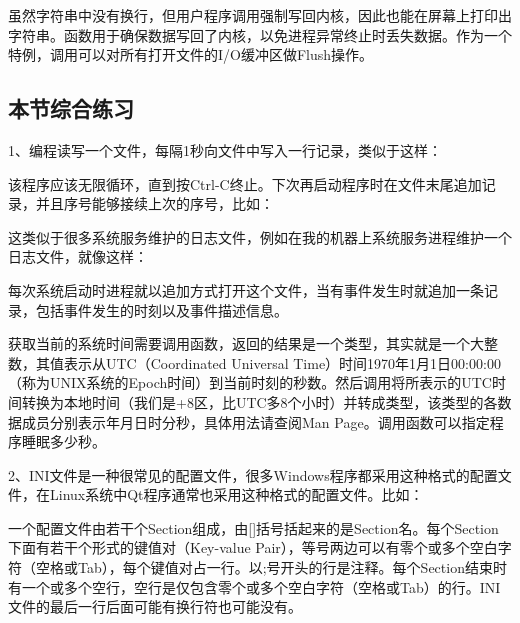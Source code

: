 虽然字符串中没有换行，但用户程序调用强制写回内核，因此也能在屏幕上打印出字符串。函数用于确保数据写回了内核，以免进程异常终止时丢失数据。作为一个特例，调用可以对所有打开文件的I/\BookSplit{}O缓冲区做Flush操作。


\subsection{本节综合练习}
%


1、编程读写一个文件，每隔1秒向文件中写入一行记录，类似于这样：




该程序应该无限循环，直到按Ctrl-C终止。下次再启动程序时在文件末尾追加记录，并且序号能够接续上次的序号，比如：




这类似于很多系统服务维护的日志文件，例如在我的机器上系统服务进程维护一个日志文件，就像这样：




每次系统启动时进程就以追加方式打开这个文件，当有事件发生时就追加一条记录，包括事件发生的时刻以及事件描述信息。



获取当前的系统时间需要调用函数，返回的结果是一个类型，其实就是一个大整数，其值表示从UTC（Coordinated Universal Time）时间1970年1月1日00:\BookSplit{}00:\BookSplit{}00（称为UNIX系统的Epoch时间）到当前时刻的秒数。然后调用将所表示的UTC时间转换为本地时间（我们是+8区，比UTC多8个小时）并转成类型，该类型的各数据成员分别表示年月日时分秒，具体用法请查阅Man Page。调用函数可以指定程序睡眠多少秒。



2、INI文件是一种很常见的配置文件，很多Windows程序都采用这种格式的配置文件，在Linux系统中Qt程序通常也采用这种格式的配置文件。比如：




一个配置文件由若干个Section组成，由[]括号括起来的是Section名。每个Section下面有若干个形式的键值对（Key-value Pair），等号两边可以有零个或多个空白字符（空格或Tab），每个键值对占一行。以;号开头的行是注释。每个Section结束时有一个或多个空行，空行是仅包含零个或多个空白字符（空格或Tab）的行。INI文件的最后一行后面可能有换行符也可能没有。



